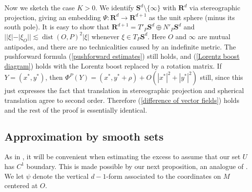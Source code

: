 \documentclass[reqno,10pt]{amsart}
\newcommand{\RR}{\mathbf{R}}
\newcommand{\Sph}{\mathbf S}
\DeclareMathOperator{\dist}{dist}
\theoremstyle{definition}
\numberwithin{equation}{section}
\begin{document}
Now we sketch the case $K > 0$.
We identify $\Sph^d \setminus \{\infty\}$ with $\RR^d$ via stereographic projection, giving an embedding $\Psi: \RR^d \to \RR^{d + 1}$ as the unit sphere (minus its south pole).
It is easy to show that $\RR^{d + 1} = T'_P \Sph^d \oplus N'_P \Sph^d$ and $||\xi| - |\xi_O|| \lesssim \dist(O, P)^2 |\xi|$ whenever $\xi \in T_P \Sph^d$.
Here $O$ and $\infty$ are mutual antipodes, and there are no technicalities caused by an indefinite metric.
The pushforward formula (\ref{pushforward estimates}) still holds, and (\ref{Lorentz boost diagram}) holds with the Lorentz boost replaced by a rotation matrix.
If $Y = (x^*, y^*)$, then $\Phi^P(Y) = (x^*, y^* + \rho) + O(|x^*|^2 + |y^*|^2)$ still, since this just expresses the fact that translation in stereographic projection and spherical translation agree to second order.
Therefore (\ref{difference of vector fields}) holds and the rest of the proof is essentially identical.

\subsection{Approximation by smooth sets}
As in \cite[Chapter 6]{Giusti77}, it will be convenient when estimating the excess to assume that our set $U$ has $C^1$ boundary.
This is made possible by our next proposition, an analogue of \cite[Lemma 7.5]{Giusti77}.
We let $\psi$ denote the vertical $d-1$-form associated to the coordinates on $M$ centered at $O$.
\end{document}
